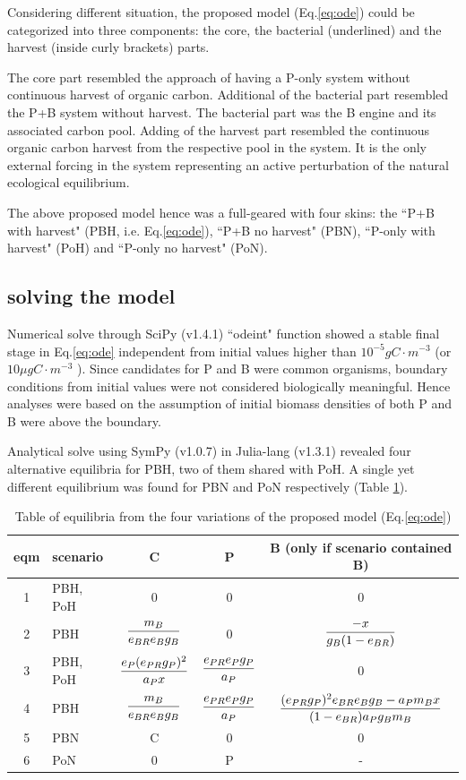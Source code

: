 \documentclass[../thesis.tex]{subfiles} %
\begin{document}
Considering different situation, the proposed model (Eq.\ref{eq:ode}) could be categorized into three components: the core, the bacterial (underlined) and the harvest (inside curly brackets) parts.

The core part resembled the approach of having a P-only system without continuous harvest of organic carbon.  Additional of the bacterial part resembled the P+B system without harvest.  The bacterial part was the B engine and its associated carbon pool.  Adding of the harvest part resembled the continuous organic carbon harvest from the respective pool in the system.  It is the only external forcing in the system representing an active perturbation of the natural ecological equilibrium.

The above proposed model hence was a full-geared with four skins: the ``P+B with harvest" (PBH, i.e. Eq.\ref{eq:ode}), ``P+B no harvest" (PBN), ``P-only with harvest" (PoH) and ``P-only no harvest" (PoN).

\subsection{solving the model}
Numerical solve through SciPy (v1.4.1) ``odeint" function showed a stable final stage in Eq.\ref{eq:ode} independent from initial values higher than $10^{-5}gC\cdot m^{-3}$ (or $10\mu gC\cdot m^{-3}$ ).  Since candidates for P and B were common organisms, boundary conditions from initial values were not considered biologically meaningful.  Hence analyses were based on the assumption of initial biomass densities of both P and B were above the boundary.

Analytical solve using SymPy (v1.0.7) in Julia-lang (v1.3.1) revealed four alternative equilibria for PBH, two of them shared with PoH.  A single yet different equilibrium was found for PBN and PoN respectively (Table \ref{tab:eqm}).

\begin{table}[H]
    \centering
    \caption{Table of equilibria from the four variations of the proposed model (Eq.\ref{eq:ode})}
    \begin{tabular}{cl|ccc}\hline
        eqm & scenario & C & P & B (only if scenario contained B) \\\hline
        1 & PBH, PoH & 0 & 0 & 0 \\
        2 & PBH & $\dfrac{m_B}{e_{BR}e_Bg_B}$ & 0 & $\dfrac{-x}{g_B(1-e_{BR})}$ \\
        3 & PBH, PoH & $\dfrac{e_P(e_{PR}g_P)^2}{a_P x}$ & $\dfrac{e_{PR}e_Pg_P}{a_P}$ & 0 \\
        4 & PBH & $\dfrac{m_B}{e_{BR}e_Bg_B}$ & $\dfrac{e_{PR}e_Pg_P}{a_P}$ & $\dfrac{(e_{PR}g_P)^2e_{BR}e_Bg_B-a_Pm_B x}{(1-e_{BR})a_Pg_Bm_B}$ \\
        5 & PBN & C & 0 & 0 \\
        6 & PoN & 0 & P & - \\\hline
    \end{tabular}
    \label{tab:eqm}
\end{table}
\end{document}
